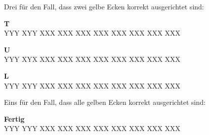 Drei für den Fall, dass zwei gelbe Ecken korrekt ausgerichtet sind:
\parbox{0.3\linewidth}{
	\begin{center}
		\textbf{T} \\[1ex]
		\RubikCubeGreyAll%
					{Y}{Y}{Y}
					{X}{Y}{Y}%
			 {X}{X}{X}
			 {X}{X}{X}%
			 {X}{X}{X}
			 {X}{X}{X}%
			{X}{X}{X}
			{X}{X}{X}%
			{X}{X}{X}
			{X}{X}{X}%
	\end{center}
}\parbox{0.3\linewidth}{
	\begin{center}
		\textbf{U} \\[1ex]
		\RubikCubeGreyAll%
					{Y}{Y}{Y}
					{X}{Y}{X}%
			 {X}{X}{X}
			 {X}{X}{X}%
			 {X}{X}{X}
			 {X}{X}{X}%
			{X}{X}{X}
			{X}{X}{X}%
			{X}{X}{X}
			{X}{X}{X}%
	\end{center}
}\parbox{0.3\linewidth}{
	\begin{center}
		\textbf{L} \\[1ex]
		\RubikCubeGreyAll%
					{Y}{Y}{Y}
					{X}{Y}{Y}%
			 {X}{X}{X}
			 {X}{X}{X}%
			 {X}{X}{X}
			 {X}{X}{X}%
			{X}{X}{X}
			{X}{X}{X}%
			{X}{X}{X}
			{X}{X}{X}%
	\end{center}
}

Eins für den Fall, dass alle gelben Ecken korrekt ausgerichtet sind:
\parbox{\linewidth}{
\begin{center}
  \textbf{Fertig} \\[1ex]
  \RubikCubeGreyAll%
	      {Y}{Y}{Y}
	      {Y}{Y}{Y}%
		 {X}{X}{X}
		 {X}{X}{X}%
		 {X}{X}{X}
		 {X}{X}{X}%
		{X}{X}{X}
		{X}{X}{X}%
		{X}{X}{X}
		{X}{X}{X}%
\end{center}
}\\[3em]

